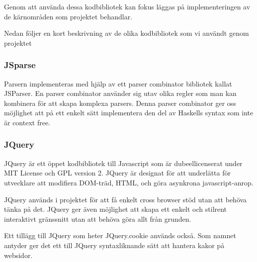 Genom att använda dessa kodbibliotek kan fokus läggas på implementeringen av de kärnområden som projektet behandlar.

Nedan följer en kort beskrivning av de olika kodbibliotek som vi användt genom projektet

 \subsubsection{JSparse}  
Parsern implementeras med hjälp av ett parser combinator bibliotek kallat JSParser.
En parser combinator använder sig utav olika regler som man kan kombinera för att skapa komplexa parsers. 
Denna parser combinator ger oss möjlighet att på ett enkelt sätt
implementera den del av  Haskells syntax som inte är context free.

\subsubsection{JQuery} 

JQuery är ett öppet kodbibliotek till Javascript som är dubeellicenserat under MIT License och GPL version 2.  
JQuery är designat för att underlätta för utvecklare att modifiera DOM-träd, HTML, och göra asynkrona javascript-anrop.

JQuery används i projektet för att få enkelt cross browser stöd utan att behöva tänka på det. 
JQuery ger även möjlighet att skapa ett enkelt och stilrent interaktivt gränssnitt utan att behöva göra allt från grunden.

Ett tillägg till JQuery som heter JQuery.cookie används också. Som namnet antyder ger det ett till JQuery syntaxliknande sätt att hantera kakor på websidor.  







